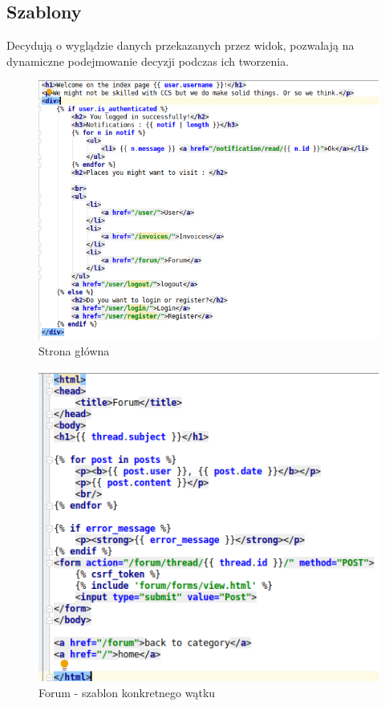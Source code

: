 \documentclass[12pt]{article}
\begin{document}
\subsection{Szablony}
Decydują o wyglądzie danych przekazanych przez widok, pozwalają na dynamiczne podejmowanie decyzji podczas ich tworzenia.
\begin{figure}[H]
	\centering
	\includegraphics[scale=0.7]{img/c_template.png}
	\caption{Strona główna}
\end{figure}
\begin{figure}[H]
	\centering
	\includegraphics[scale=0.7]{img/c_forum_template.png}
	\caption{Forum - szablon konkretnego wątku}
\end{figure}
\end{document}
